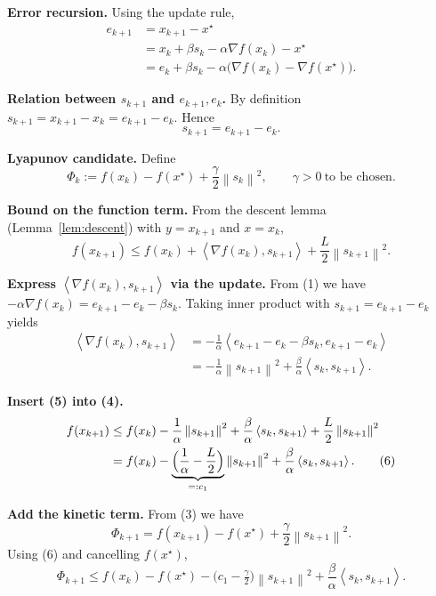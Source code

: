 \documentclass{article}
\newcommand{\norm}[1]{\left\lVert#1\right\rVert}
\newcommand{\inner}[2]{\left\langle #1,#2\right\rangle}
\begin{document}
\begin{enumerate}[label={[\textbf{Step \arabic*}]}]
\item \textbf{Error recursion.}  
Using the update rule,
\[
\begin{aligned}
e_{k+1}
&=x_{k+1}-x^{\star}\\
&=x_k+\beta s_k-\alpha\nabla f(x_k)-x^{\star}\\
&=e_k+\beta s_k-\alpha\bigl(\nabla f(x_k)-\nabla f(x^{\star})\bigr). \tag{1}
\end{aligned}
\]

\item \textbf{Relation between $s_{k+1}$ and $e_{k+1},e_k$.}  
By definition $s_{k+1}=x_{k+1}-x_k=e_{k+1}-e_k$. Hence
\[
s_{k+1}=e_{k+1}-e_k. \tag{2}
\]

\item \textbf{Lyapunov candidate.}  
Define
\[
\Phi_k:=f(x_k)-f(x^{\star})+\frac{\gamma}{2}\norm{s_k}^{2},
\qquad\gamma>0\ \text{to be chosen}. \tag{3}
\]

\item \textbf{Bound on the function term.}  
From the descent lemma (Lemma~\ref{lem:descent}) with $y=x_{k+1}$ and $x=x_k$,
\[
f(x_{k+1})\le f(x_k)+\inner{\nabla f(x_k)}{s_{k+1}}+\frac{L}{2}\norm{s_{k+1}}^{2}. \tag{4}
\]

\item \textbf{Express $\inner{\nabla f(x_k)}{s_{k+1}}$ via the update.}  
From (1) we have $-\alpha\nabla f(x_k)=e_{k+1}-e_k-\beta s_k$. Taking inner product with $s_{k+1}=e_{k+1}-e_k$ yields
\[
\begin{aligned}
\inner{\nabla f(x_k)}{s_{k+1}}
&=-\frac{1}{\alpha}\inner{e_{k+1}-e_k-\beta s_k}{e_{k+1}-e_k}\\
&=-\frac{1}{\alpha}\norm{s_{k+1}}^{2}+\frac{\beta}{\alpha}\inner{s_k}{s_{k+1}}. \tag{5}
\end{aligned}
\]

\item \textbf{Insert (5) into (4).}  
\[
\begin{aligned}
f(x_{k+1})&\le f(x_k)-\frac{1}{\alpha}\norm{s_{k+1}}^{2}
+\frac{\beta}{\alpha}\inner{s_k}{s_{k+1}}+\frac{L}{2}\norm{s_{k+1}}^{2}\\
&= f(x_k)-\underbrace{\Bigl(\frac{1}{\alpha}-\frac{L}{2}\Bigr)}_{=:c_1}\norm{s_{k+1}}^{2}
+\frac{\beta}{\alpha}\inner{s_k}{s_{k+1}}. \tag{6}
\end{aligned}
\]

\item \textbf{Add the kinetic term.}  
From (3) we have
\[
\Phi_{k+1}=f(x_{k+1})-f(x^{\star})+\frac{\gamma}{2}\norm{s_{k+1}}^{2}.
\]
Using (6) and cancelling $f(x^{\star})$,
\[
\Phi_{k+1}\le f(x_k)-f(x^{\star})
-\bigl(c_1-\tfrac{\gamma}{2}\bigr)\norm{s_{k+1}}^{2}
+\frac{\beta}{\alpha}\inner{s_k}{s_{k+1}}. \tag{7}
\]


\end{enumerate}
\end{document}
